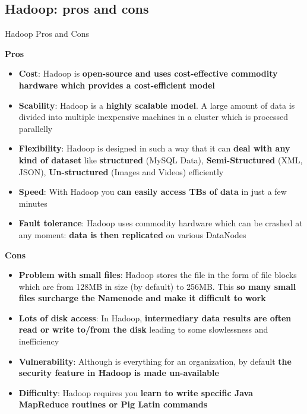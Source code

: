 \documentclass{beamer}[10pt, usepdftitle=false handout]
\begin{document}
\subsection{Hadoop: pros and cons}

\begin{frame}
Hadoop Pros and Cons
\vspace*{0.6em}

\textbf{Pros}

\begin{itemize}
\item{\textbf{Cost}: Hadoop is \textbf{open-source and uses cost-effective commodity hardware which provides a cost-efficient model}}
\item{\textbf{Scability}: Hadoop is a \textbf{highly scalable model}. A large amount of data is divided into multiple inexpensive machines in a cluster which is processed parallelly}
\item{\textbf{Flexibility}: Hadoop is designed in such a way that it can \textbf{deal with any kind of dataset} like \textbf{structured} (MySQL Data), \textbf{Semi-Structured} (XML, JSON), \textbf{Un-structured} (Images and Videos) efficiently}
\item{\textbf{Speed}: With Hadoop you \textbf{can easily access TBs of data} in just a few minutes}
\item{\textbf{Fault tolerance}: Hadoop uses commodity hardware which can be crashed at any moment: \textbf{data is then replicated} on various DataNodes}
\end{itemize}


\end{frame}


\begin{frame}

\textbf{Cons}

\begin{itemize}
\item{\textbf{Problem with small files}: Hadoop stores the file in the form of file blocks which are from 128MB in size (by default) to 256MB. This \textbf{so many small files surcharge the Namenode and make it difficult to work}}
\item{\textbf{Lots of disk access}: In Hadoop, \textbf{intermediary data results are often read or write to/from the disk} leading to some slowlessness and inefficiency}
\item{\textbf{Vulnerability}: Although is everything for an organization, by default \textbf{the security feature in Hadoop is made un-available}}
\item{\textbf{Difficulty}: Hadoop requires you \textbf{learn to write specific Java MapReduce routines or Pig Latin commands}}
\end{itemize}

\end{frame}
\end{document}
